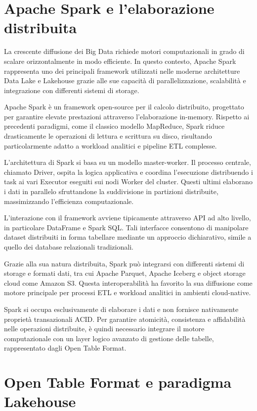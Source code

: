 \documentclass[12pt,a4paper,openright,twoside]{book}
\begin{document}
\section{Apache Spark e l'elaborazione distribuita}
La crescente diffusione dei Big Data richiede motori computazionali in grado di scalare orizzontalmente in modo efficiente.
In questo contesto, Apache Spark rappresenta uno dei principali framework utilizzati nelle moderne architetture Data Lake e Lakehouse grazie alle sue capacità di parallelizzazione, scalabilità e integrazione con differenti sistemi di storage. \cite{SparkDocs}

Apache Spark è un framework open-source per il calcolo distribuito, progettato per garantire elevate prestazioni attraverso l'elaborazione in-memory. 
Rispetto ai precedenti paradigmi, come il classico modello MapReduce, Spark riduce drasticamente le operazioni di lettura e scrittura su disco, risultando particolarmente adatto a workload analitici e pipeline ETL complesse.

L’architettura di Spark si basa su un modello master-worker.
Il processo centrale, chiamato Driver, ospita la logica applicativa e coordina l'esecuzione distribuendo i task ai vari Executor eseguiti sui nodi Worker del cluster.
Questi ultimi elaborano i dati in parallelo sfruttandone la suddivisione in partizioni distribuite, massimizzando l'efficienza computazionale.

L'interazione con il framework avviene tipicamente attraverso API ad alto livello, in particolare DataFrame e Spark SQL. 
Tali interfacce consentono di manipolare dataset distribuiti in forma tabellare mediante un approccio dichiarativo, simile a quello dei database relazionali tradizionali. 

Grazie alla sua natura distribuita, Spark può integrarsi con differenti sistemi di storage e formati dati, tra cui Apache Parquet, Apache Iceberg e object storage cloud come Amazon S3. 
Questa interoperabilità ha favorito la sua diffusione come motore principale per processi ETL e workload analitici in ambienti cloud-native.

Spark si occupa esclusivamente di elaborare i dati e non fornisce nativamente proprietà transazionali ACID. 
Per garantire atomicità, consistenza e affidabilità nelle operazioni distribuite, è quindi necessario integrare il motore computazionale con un layer logico avanzato di gestione delle tabelle, rappresentato dagli Open Table Format.

\section{Open Table Format e paradigma Lakehouse}
\end{document}
